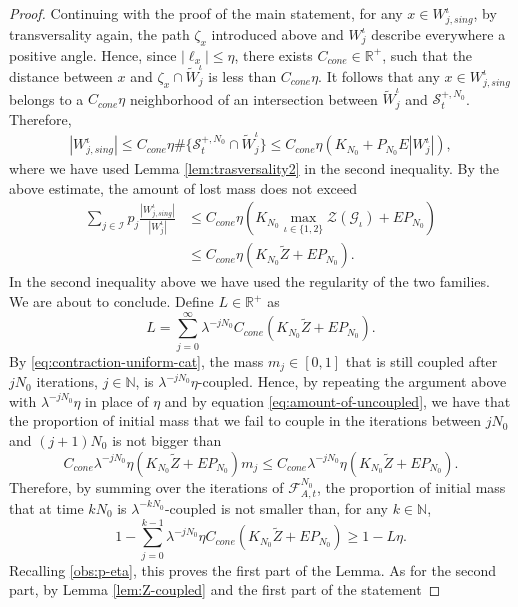 \documentclass{amsart}
\numberwithin{equation}{section}
\renewcommand{\ge}{\geqslant}
\renewcommand{\le}{\leqslant}
\newcommand\cF{{\mathcal F}}
\newcommand\cG{{\mathcal G}}
\newcommand\cI{{\mathcal I}}
\newcommand\cS{{\mathcal S}}
\newcommand\cZ{{\mathcal Z}}
\newcommand\bN{{\mathbb N}}
\newcommand\bR{{\mathbb R}}
\newcommand{\catt}{\cF_{A,t}}
\begin{document}
\begin{proof}
Continuing with the proof of the main statement, for any \(x \in W^{\iota}_{j,sing}\), by transversality again, the path \(\zeta_x\) introduced above and \( W^{\iota}_{j}\) describe everywhere a positive angle. Hence, since \(|\ell_x| \le \eta\), there exists \(C_{cone} \in \bR^+\), such that the distance between \(x\) and \(\zeta_x \cap \widetilde W^{\iota}_{j}\) is less than \(C_{cone}\eta\). It follows that any \(x \in W^{\iota}_{j,sing}\) belongs to a \(C_{cone}\eta\) neighborhood of an intersection between \(\widetilde W^{\iota}_{j}\) and \(\cS_t^{+, N_0}\). Therefore, 
\[
\begin{split}
    | W_{j,sing}^\iota|  \le C_{cone} \eta \#\{\cS_t^{+, N_0} \cap \widetilde W^{\iota}_{j}\} \le  C_{cone}\eta \left(K_{N_0} + P_{N_0}E|W^\iota_j|\right),
\end{split}
\]
where we have used Lemma \ref{lem:trasversality2} in the second inequality. By the above estimate, the amount of lost mass does not exceed
\begin{equation}\label{eq:amount-of-uncoupled}
\begin{split}
       \sum_{j \in \cI} p_{j}\frac{| W^\iota_{j,sing}|}{|W^{\iota}_j|}  &\le C_{cone}\eta(K_{N_0}\max_{\iota \in \{1,2\}}\cZ(\cG_{\iota}) + E P_{N_0}) \\
&\le  C_{cone}\eta(K_{N_0} \widetilde Z + E P_{N_0}).
\end{split}
\end{equation}
In the second inequality above we have used the regularity of the two families. We are about to conclude. Define \(L \in \bR^+\) as
\[
L = \sum_{j =0}^{\infty} \lambda^{-jN_0} C_{cone}(K_{N_0} \widetilde Z + E P_{N_0}).
\] 
By \eqref{eq:contraction-uniform-cat}, the mass \(m_j \in [0,1]\) that is still coupled after \(j N_0\) iterations, \(j \in \bN\), is \(\lambda^{-j N_0}\eta\)-coupled. Hence, by repeating the argument above with \(\lambda^{-j N_0}\eta\) in place of \(\eta\) and by equation \eqref{eq:amount-of-uncoupled}, we have that the proportion of initial mass that we fail to couple in the iterations between \(jN_0\) and \((j+1)N_0\) is not bigger than
\[
    C_{cone}\lambda^{-j N_0}\eta(K_{N_0} \widetilde Z + E P_{N_0}) m_j \le  C_{cone}\lambda^{-j N_0}\eta(K_{N_0} \widetilde Z + E P_{N_0}).
\]
Therefore, by summing over the iterations of \(\catt^{N_0}\), the proportion of initial mass that at time \(k N_0\) is \(\lambda^{-kN_0}\)-coupled is not smaller than, for any \(k \in \bN\),
\[
 1-\sum_{j=0}^{k-1} \lambda^{-j N_0}\eta C_{cone}(K_{N_0} \widetilde Z + E P_{N_0}) \ge 1- L\eta.
\]
Recalling \ref{obs:p-eta}, this proves the first part of the Lemma. As for the second part, by Lemma \ref{lem:Z-coupled} and the first part of the statement

\end{proof}
\end{document}
